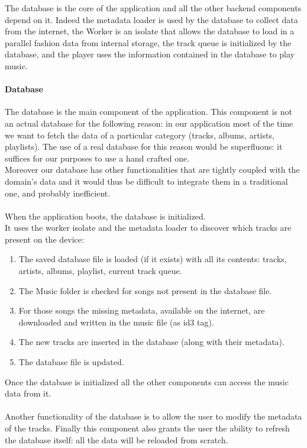 \documentclass{article}
\begin{document}
The database is the core of the application and all the other backend components
depend on it. Indeed the metadata loader is used by the database to collect data
from the internet, the Worker is an isolate that allows the database to load in
a parallel fashion data from internal storage, the track queue is initialized by
the database, and the player uses the information contained in the database to
play music.

\paragraph{Database}
The database is the main component of the application. This component is not an
actual database for the following reason: in our application most of the time we
want to fetch the data of a particular category (tracks, albums, artists,
playlists). The use of a real database for this reason would be superfluous: it
suffices for our purposes to use a hand crafted one.
\\
Moreover our database has other functionalities that are tightly coupled with
the domain's data and it would thus be difficult to integrate them in a
traditional one, and probably inefficient.
\\\\
When the application boots, the database is initialized.
\\
It uses the worker isolate and the metadata loader to discover which tracks are
present on the device:
\begin{enumerate}
    \item The saved database file is loaded (if it exists) with all its
        contents: tracks, artists, albums, playlist, current track queue.
    \item The Music folder is checked for songs not present in the database
        file.
    \item For those songs the missing metadata, available on the internet, are
        downloaded and written in the music file (as id3 tag). 
    \item The new tracks are inserted in the database (along with their
        metadata).
    \item The database file is updated.
\end{enumerate}
Once the database is initialized all the other components can access the music
data from it. 
\\\\
Another functionality of the database is to allow the user to modify the
metadata of the tracks. Finally this component also grants the user the ability
to refresh the database itself: all the data will be reloaded from scratch.
\end{document}

